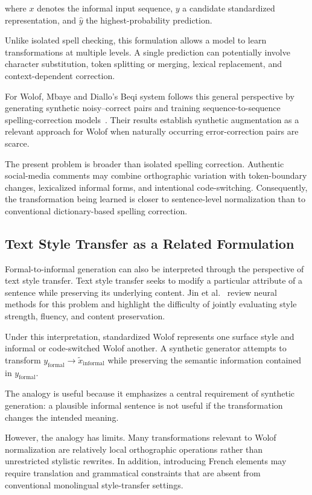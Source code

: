 \documentclass[12pt, a4paper, twoside, openany]{report}
\begin{document}
where $x$ denotes the informal input sequence, $y$ a candidate standardized representation, and $\hat{y}$ the highest-probability prediction.

Unlike isolated spell checking, this formulation allows a model to learn transformations at multiple levels. A single prediction can potentially involve character substitution, token splitting or merging, lexical replacement, and context-dependent correction.

For Wolof, Mbaye and Diallo's Beqi system follows this general perspective by generating synthetic noisy--correct pairs and training sequence-to-sequence spelling-correction models~\cite{mbaye2025beqi}. Their results establish synthetic augmentation as a relevant approach for Wolof when naturally occurring error-correction pairs are scarce.

The present problem is broader than isolated spelling correction. Authentic social-media comments may combine orthographic variation with token-boundary changes, lexicalized informal forms, and intentional code-switching. Consequently, the transformation being learned is closer to sentence-level normalization than to conventional dictionary-based spelling correction.


\subsection{Text Style Transfer as a Related Formulation}

Formal-to-informal generation can also be interpreted through the perspective of text style transfer. Text style transfer seeks to modify a particular attribute of a sentence while preserving its underlying content. Jin et al.~\cite{jin2022styletransfer} review neural methods for this problem and highlight the difficulty of jointly evaluating style strength, fluency, and content preservation.

Under this interpretation, standardized Wolof represents one surface style and informal or code-switched Wolof another. A synthetic generator attempts to transform $y_{\text{formal}} \longrightarrow \tilde{x}_{\text{informal}}$ while preserving the semantic information contained in $y_{\text{formal}}$.

The analogy is useful because it emphasizes a central requirement of synthetic generation: a plausible informal sentence is not useful if the transformation changes the intended meaning.

However, the analogy has limits. Many transformations relevant to Wolof normalization are relatively local orthographic operations rather than unrestricted stylistic rewrites. In addition, introducing French elements may require translation and grammatical constraints that are absent from conventional monolingual style-transfer settings.
\end{document}
